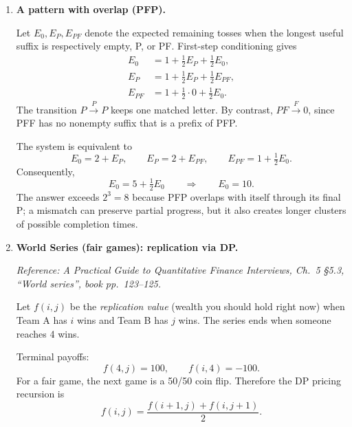 \documentclass[11pt]{article}
\begin{document}
\begin{enumerate}[leftmargin=*, itemsep=1.0em]
Rearrange:
\[
E_k - \tfrac12 E_{k+1} = 1 + \tfrac12 E_0.
\]
Solve by backward substitution. First, with $k=n-1$:
\[
E_{n-1} = 1 + \tfrac12 E_n + \tfrac12 E_0 = 1 + \tfrac12 E_0.
\]
With $k=n-2$:
\[
E_{n-2}=1+\tfrac12 E_{n-1}+\tfrac12 E_0
=1+\tfrac12\Bigl(1+\tfrac12 E_0\Bigr)+\tfrac12 E_0
=\tfrac32+\tfrac34 E_0.
\]
Continuing this pattern yields
\[
E_{n-m} = \bigl(2-2^{-m+1}\bigr) + \bigl(1-2^{-m+1}\bigr)E_0,
\]
and plugging $m=n$ (i.e.\ $E_0$ on the left) gives the closed form
\[
E_0 = 2^{n+1}-2.
\]
Hence
\[
\boxed{\mathbb{E}[T_n]=2^{n+1}-2.}
\]
(Check: for $n=1$, gives $2$; for $n=3$, gives $14$, matching the earlier result.)

\item \textbf{A pattern with overlap (PFP).}

Let $E_0,E_P,E_{PF}$ denote the expected remaining tosses when the longest
useful suffix is respectively empty, P, or PF. First-step conditioning gives
\[
\begin{aligned}
E_0&=1+\tfrac12E_P+\tfrac12E_0,\\
E_P&=1+\tfrac12E_P+\tfrac12E_{PF},\\
E_{PF}&=1+\tfrac12\cdot0+\tfrac12E_0.
\end{aligned}
\]
The transition $P\xrightarrow{P}P$ keeps one matched letter. By contrast,
$PF\xrightarrow{F}0$, since PFF has no nonempty suffix that is a prefix of
PFP.

The system is equivalent to
\[
E_0=2+E_P,
\qquad E_P=2+E_{PF},
\qquad E_{PF}=1+\tfrac12E_0.
\]
Consequently,
\[
E_0=5+\tfrac12E_0
\qquad\Longrightarrow\qquad
\boxed{E_0=10}.
\]
The answer exceeds $2^3=8$ because PFP overlaps with itself through its final
P; a mismatch can preserve partial progress, but it also creates longer
clusters of possible completion times.

\item \textbf{World Series (fair games): replication via DP.}

\textit{Reference: A Practical Guide to Quantitative Finance Interviews, Ch.\ 5 \S5.3, ``World series'', book pp.\ 123--125.}

\medskip
Let $f(i,j)$ be the \emph{replication value} (wealth you should hold right now) when Team A has $i$ wins and Team B has $j$ wins. The series ends when someone reaches 4 wins.

Terminal payoffs:
\[
f(4,j)=100,\qquad f(i,4)=-100.
\]
For a fair game, the next game is a 50/50 coin flip. Therefore the DP pricing recursion is
\[
f(i,j)=\frac{f(i+1,j)+f(i,j+1)}{2}.
\]


\end{enumerate}
\end{document}
